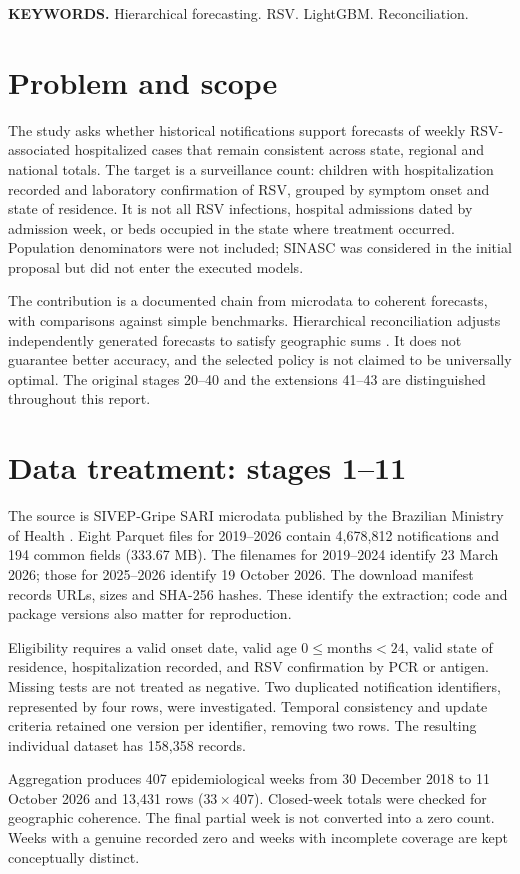 \documentclass[12pt,a4paper]{article}
\begin{document}
\noindent\textbf{KEYWORDS.} Hierarchical forecasting. RSV. LightGBM. Reconciliation.
\newpage
\section{Problem and scope}
The study asks whether historical notifications support forecasts of weekly RSV-associated hospitalized cases that remain consistent across state, regional and national totals. The target is a surveillance count: children with hospitalization recorded and laboratory confirmation of RSV, grouped by symptom onset and state of residence. It is not all RSV infections, hospital admissions dated by admission week, or beds occupied in the state where treatment occurred. Population denominators were not included; SINASC was considered in the initial proposal but did not enter the executed models.

The contribution is a documented chain from microdata to coherent forecasts, with comparisons against simple benchmarks. Hierarchical reconciliation adjusts independently generated forecasts to satisfy geographic sums \cite{fpp}. It does not guarantee better accuracy, and the selected policy is not claimed to be universally optimal. The original stages 20--40 and the extensions 41--43 are distinguished throughout this report.

\section{Data treatment: stages 1--11}
The source is SIVEP-Gripe SARI microdata published by the Brazilian Ministry of Health \cite{data}. Eight Parquet files for 2019--2026 contain 4,678,812 notifications and 194 common fields (333.67 MB). The filenames for 2019--2024 identify 23 March 2026; those for 2025--2026 identify 19 October 2026. The download manifest records URLs, sizes and SHA-256 hashes. These identify the extraction; code and package versions also matter for reproduction.

Eligibility requires a valid onset date, valid age $0\leq\text{months}<24$, valid state of residence, hospitalization recorded, and RSV confirmation by PCR or antigen. Missing tests are not treated as negative. Two duplicated notification identifiers, represented by four rows, were investigated. Temporal consistency and update criteria retained one version per identifier, removing two rows. The resulting individual dataset has 158,358 records.

Aggregation produces 407 epidemiological weeks from 30 December 2018 to 11 October 2026 and 13,431 rows ($33\times407$). Closed-week totals were checked for geographic coherence. The final partial week is not converted into a zero count. Weeks with a genuine recorded zero and weeks with incomplete coverage are kept conceptually distinct.
\end{document}
